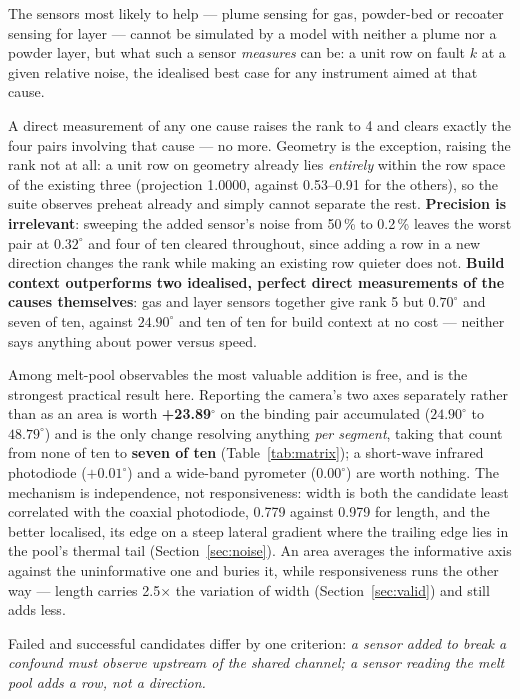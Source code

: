\documentclass[final,5p,times,twocolumn]{elsarticle}
\begin{document}
The sensors most likely to help --- plume sensing for gas, powder-bed or
recoater sensing for layer \cite{Liu2022,Bugatti2022} --- cannot be simulated by
a model with neither a plume nor a powder layer, but what such a sensor
\emph{measures} can be: a unit row on fault $k$ at a given relative noise, the
idealised best case for any instrument aimed at that cause.

A direct measurement of any one cause raises the rank to 4 and clears exactly the
four pairs involving that cause --- no more. Geometry is the exception, raising
the rank not at all: a unit row on geometry already lies \emph{entirely} within
the row space of the existing three (projection 1.0000, against 0.53--0.91 for
the others), so the suite observes preheat already and simply cannot separate the
rest. \textbf{Precision is irrelevant}: sweeping the added sensor's noise from
50\,\% to 0.2\,\% leaves the worst pair at $0.32^\circ$ and four of ten cleared
throughout, since adding a row in a new direction changes the rank while making
an existing row quieter does not. \textbf{Build context outperforms two
idealised, perfect direct measurements of the causes themselves}: gas and layer
sensors together give rank 5 but $0.70^\circ$ and seven of ten, against
$24.90^\circ$ and ten of ten for build context at no cost --- neither says
anything about power versus speed.

Among melt-pool observables the most valuable addition is free, and is the
strongest practical result here. Reporting the camera's two axes separately
rather than as an area is worth \textbf{+23.89$^\circ$} on the binding pair
accumulated ($24.90^\circ$ to $48.79^\circ$) and is the only change resolving
anything \emph{per segment}, taking that count from none of ten to \textbf{seven
of ten} (Table~\ref{tab:matrix}); a short-wave infrared photodiode
($+0.01^\circ$) and a wide-band pyrometer ($0.00^\circ$) are worth nothing. The
mechanism is independence, not responsiveness: width is both the candidate least
correlated with the coaxial photodiode, 0.779 against 0.979 for length, and the
better localised, its edge on a steep lateral gradient where the trailing edge
lies in the pool's thermal tail (Section~\ref{sec:noise}). An area averages the
informative axis against the uninformative one and buries it, while
responsiveness runs the other way --- length carries 2.5$\times$ the variation of
width (Section~\ref{sec:valid}) and still adds less.

Failed and successful candidates differ by one criterion: \emph{a sensor added to
break a confound must observe upstream of the shared channel; a sensor reading
the melt pool adds a row, not a direction.}
\end{document}

